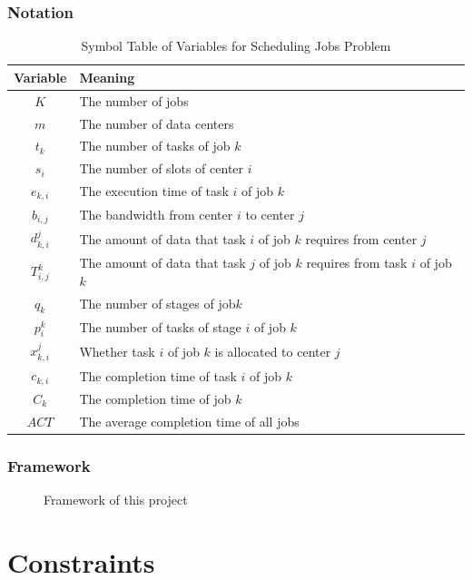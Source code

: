 \begin{frame}
\frametitle{Notation}
\begin{table}[h]
    \centering\scriptsize
    \caption{Symbol Table of Variables for Scheduling Jobs Problem}\label{tab:variables}
    \begin{tabular}{c|l}
    \hline
         Variable & Meaning\\
    \hline
        $K$ & The number of jobs\\
        $m$ & The number of data centers\\
        $t_k$ & The number of tasks of job $k$\\
        $s_i$ & The number of slots of center $i$\\
        $e_{k,i}$ & The execution time of task $i$ of job $k$\\
        $b_{i,j}$ & The bandwidth from center $i$ to center $j$\\
        $d_{k,i}^j$ & The amount of data that task $i$ of job $k$ requires from center $j$\\
        $T_{i,j}^k$ & The amount of data that task $j$ of job $k$ requires from task $i$ of job $k$\\
        $q_k$ & The number of stages of job$k$\\
        $p_i^k$ & The number of tasks of stage $i$ of job $k$\\
        $x_{k,i}^j$ & Whether task $i$ of job $k$ is allocated to center $j$\\
        $c_{k,i}$ & The completion time of task $i$ of job $k$\\
        $C_k$ & The completion time of job $k$\\
        $ACT$ & The average completion time of all jobs\\
    \hline
    \end{tabular}
\end{table}
\end{frame}

\begin{frame}
    \frametitle{Framework}
    \begin{figure}
        \centering
        
        \caption{Framework of this project}
    \end{figure}
\end{frame}

\section{Constraints}

